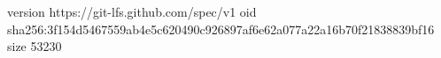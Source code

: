 version https://git-lfs.github.com/spec/v1
oid sha256:3f154d5467559ab4e5c620490c926897af6e62a077a22a16b70f21838839bf16
size 53230
